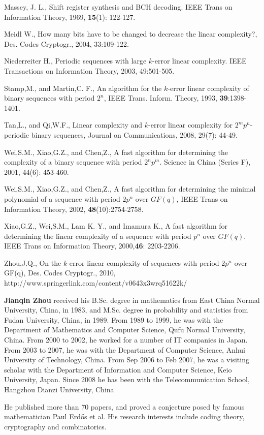 \documentclass[10pt,conference,twocolumn]{IEEEtran}
\begin{document}
\begin{thebibliography}{3}
Massey, J. L., Shift register synthesis and BCH decoding. IEEE Trans
on Information Theory, 1969, {\bf15}(1): 122-127.



Meidl W., How many bits have to be changed to decrease the linear
complexity?, Des. Codes Cryptogr., 2004, 33:109-122.

Niederreiter H., Periodic sequences with large $k$-error linear
complexity. IEEE Transactions on Information Theory, 2003,
49:501-505.


Stamp,M., and  Martin,C. F., An algorithm for the $k$-error linear
complexity of binary sequences with period $2^{n}$, IEEE Trans.
Inform. Theory, 1993, {\bf39}:1398-1401.

Tan,L., and Qi,W.F., Linear complexity and $k$-error linear
complexity for $2^mp^n$-periodic binary sequences, Journal on
Communications, 2008, 29(7): 44-49.

Wei,S.M., Xiao,G.Z., and Chen,Z., A fast algorithm for determining
the complexity of a binary sequence with period $2^np^m$. Science in
China (Series F), 2001, 44(6): 453-460.

Wei,S.M., Xiao,G.Z., and Chen,Z., A fast algorithm for determining
the minimal polynomial of a sequence with period $2p^n$ over
$GF(q)$, IEEE Trans on Information Theory, 2002,
{\bf48}(10):2754-2758.


Xiao,G.Z., Wei,S.M., Lam K. Y., and Imamura K., A fast algorithm for
determining the linear complexity of a sequence with period $p^n$
over $GF(q)$. IEEE Trans on Information Theory, 2000,{\bf 46}:
2203-2206.

 Zhou,J.Q.,  On the $k$-error linear complexity of sequences with period 2$p^n$ over GF(q),
 Des. Codes Cryptogr., 2010, http://www.springerlink.com/content/v0643x3wrq51622k/


\end{thebibliography}

{\bf Jianqin Zhou} received his B.Sc. degree in mathematics from
East China Normal University, China, in 1983, and M.Sc. degree in
probability and statistics from Fudan University, China, in 1989.
From 1989 to 1999, he was with the Department of Mathematics and
Computer Science, Qufu Normal University, China. From 2000 to 2002,
he worked for a number of IT companies in Japan. From 2003 to 2007,
he was with the Department of Computer Science, Anhui University of
Technology, China.
 From Sep 2006  to
Feb 2007, he was a visiting scholar with the Department of
Information and Computer Science, Keio University, Japan. Since 2008
he has been with the Telecommunication School, Hangzhou Dianzi
University, China


He  published more than 70 papers, and  proved a conjecture posed by
famous mathematician Paul Erd\H{o}s et al. His research interests
include coding theory, cryptography and combinatorics.
\end{document}
